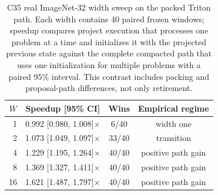 \begin{table}[t]
\centering
\caption{C35 real ImageNet-32 width sweep on the packed Triton path. Each width contains 40 paired frozen windows; speedup compares project execution that processes one problem at a time and initializes it with the projected previous state against the complete compacted path that uses one initialization for multiple problems
with a paired 95\% interval. This contrast includes packing and proposal-path
differences, not only retirement.}
\label{tab:width-regime}
\scriptsize
\setlength{\tabcolsep}{3.2pt}
\begin{tabular}{@{}rccc@{}}
\toprule
$W$ & Speedup [95\% CI] & Wins & Empirical regime \\
\midrule
1  & 0.992 [0.980, 1.008]$\times$ & 6/40  & width one \\
2  & 1.073 [1.049, 1.097]$\times$ & 33/40 & transition \\
4  & 1.229 [1.195, 1.264]$\times$ & 40/40 & positive path gain \\
8  & 1.369 [1.327, 1.411]$\times$ & 40/40 & positive path gain \\
16 & 1.621 [1.487, 1.797]$\times$ & 40/40 & positive path gain \\
\bottomrule
\end{tabular}
\end{table}
